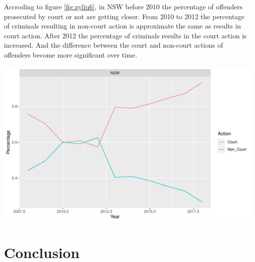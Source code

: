 \documentclass[11pt,a4paper,]{article}
\let\origfigure\figure
\let\endorigfigure\endfigure
\renewenvironment{figure}[1][2] {
\expandafter\origfigure\expandafter[H]
} {
\endorigfigure
}
\begin{document}
Accroding to figure \ref{fig:zyliu6}, in NSW before 2010 the percentage of offenders prosecuted by court or not are getting closer. From 2010 to 2012 the percentage of criminals resulting in non-court action is approximate the same as results in court action. After 2012 the percentage of criminals results in the court action is increased. And the difference between the court and non-court actions of offenders become more significant over time.

\begin{figure}
\centering
\includegraphics{ETC5513-Assignment4_files/figure-latex/zyliu6-1.pdf}
\caption{\label{fig:zyliu6}Court actions of offenders in NSW}
\end{figure}

\pagebreak

\hypertarget{conclusion}{%
\section{Conclusion}\label{conclusion}}
\end{document}
